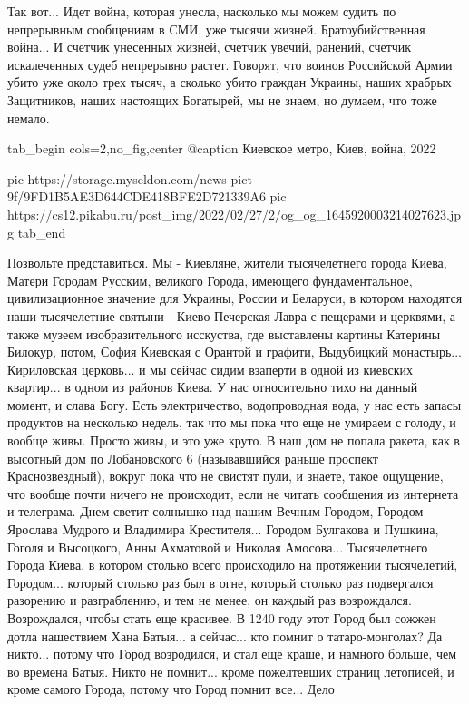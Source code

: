 Так вот... Идет война, которая унесла, насколько мы можем судить по непрерывным
сообщениям в СМИ, уже тысячи жизней. Братоубийственная война... И счетчик
унесенных жизней, счетчик увечий, ранений, счетчик искалеченных судеб
непрерывно растет. Говорят, что воинов Российской Армии убито уже около трех
тысяч, а сколько убито граждан Украины, наших храбрых Защитников, наших
настоящих Богатырей, мы не знаем, но думаем, что тоже немало. 

\ifcmt
  tab_begin cols=2,no_fig,center
		 @caption Киевское метро, Киев, война, 2022

		 pic https://storage.myseldon.com/news-pict-9f/9FD1B5AE3D644CDE418BFE2D721339A6
     pic https://cs12.pikabu.ru/post_img/2022/02/27/2/og_og_1645920003214027623.jpg
  tab_end
\fi

Позвольте представиться. Мы - Киевляне, жители тысячелетнего города Киева,
Матери Городам Русским, великого Города, имеющего фундаментальное,
цивилизационное значение для Украины, России и Беларуси, в котором находятся
наши тысячелетние святыни - Киево-Печерская Лавра с пещерами и церквями, а
также музеем изобразительного исскуства, где выставлены картины Катерины
Билокур, потом, София Киевская с Орантой и графити, Выдубицкий монастырь...
Кириловская церковь... и мы сейчас сидим взаперти в одной из киевских
квартир... в одном из районов Киева. У нас относительно тихо на данный момент,
и слава Богу. Есть электричество, водопроводная вода, у нас есть запасы
продуктов на несколько недель, так что мы пока что еще не умираем с голоду, и
вообще живы. Просто живы, и это уже круто.  В наш дом не попала ракета, как в
высотный дом по Лобановского 6 (называвшийся раньше проспект Краснозвездный),
вокруг пока что не свистят пули, и знаете, такое ощущение, что вообще почти
ничего не происходит, если не читать сообщения из интернета и телеграма.  Днем
светит солнышко над нашим Вечным Городом, Городом Ярослава Мудрого и Владимира
Крестителя... Городом Булгакова и Пушкина, Гоголя и Высоцкого, Анны Ахматовой и
Николая Амосова...  Тысячелетнего Города Киева, в котором столько всего
происходило на протяжении тысячелетий, Городом... который столько раз был в
огне, который столько раз подвергался разорению и разграблению, и тем не менее,
он каждый раз возрождался.  Возрождался, чтобы стать еще красивее. В 1240 году
этот Город был сожжен дотла нашествием Хана Батыя... а сейчас... кто помнит о
татаро-монголах?  Да никто...  потому что Город возродился, и стал еще краше, и
намного больше, чем во времена Батыя.  Никто не помнит... кроме пожелтевших
страниц летописей, и кроме самого Города, потому что Город помнит все... Дело
